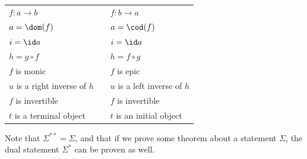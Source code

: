 \documentclass{fkbook}
\theoremstyle{snazzydefinition}
\begin{document}
\begin{adjustwidth}{1em}{1em}
\begin{definition}[Duality]
\begin{table}[H]
\begin{tabular}{@{}lll@{}}
        $f : a \to b$ && $f : b \to a$  \\
        $a = \dom(f)$ && $a = \cod(f)$ \\
        $i = \id a$ && $i = \id a$ \\
        $h = g \circ f$ && $h = f \circ g$ \\
        $f$ is monic && $f$ is epic \\
        $u$ is a right inverse of $h$ && $u$ is a left inverse of $h$
        \\
        $f$ is invertible && $f$ is invertible \\
        $t$ is a terminal object && $t$ is an initial object\\
        \bottomrule
      \end{tabular}
    \end{table}
  \end{definition}
  Note that $\Sigma^{**} = \Sigma$, and that if we prove some theorem
  about a statement $\Sigma$, the dual statement $\Sigma^*$ can be
  proven as well.

\end{adjustwidth}
\end{document}
